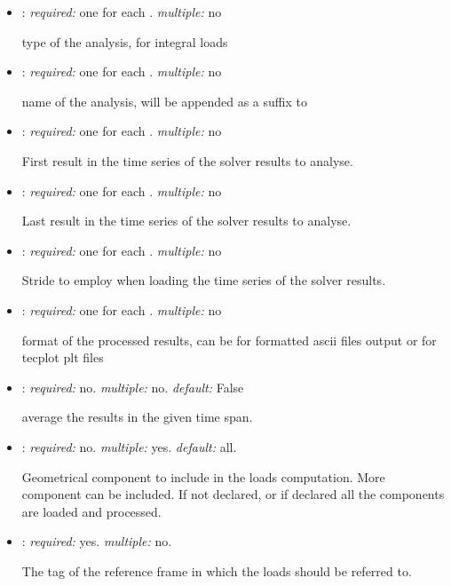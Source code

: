 \begin{itemize}
\item {}: \textit{required:} one for each . \textit{multiple:} no

type of the analysis,  for integral loads

\item {}: \textit{required:} one for each . \textit{multiple:} no

name of the analysis, will be appended as a suffix to 

\item {}: \textit{required:} one for each . \textit{multiple:} no

First result in the time series of the solver results to analyse.

\item {}: \textit{required:} one for each . \textit{multiple:} no

Last result in the time series of the solver results to analyse.

\item {}: \textit{required:} one for each . \textit{multiple:} no

Stride to employ when loading the time series of the solver results. 

\item {}: \textit{required:} one for each . \textit{multiple:} no

format of the processed results, can be  for formatted ascii files output or  for tecplot plt files

\item {}: \textit{required:} no. \textit{multiple:} no. \textit{default:} False

average the results in the given time span.

\item {}: \textit{required:} no. \textit{multiple:} yes. \textit{default:} all.

Geometrical component to include in the loads computation. More component can be included. If not declared, or if declared  all the components are loaded and processed. 

\item {}: \textit{required:} yes. \textit{multiple:} no.

The tag of the reference frame in which the loads should be referred to. 

\end{itemize}

